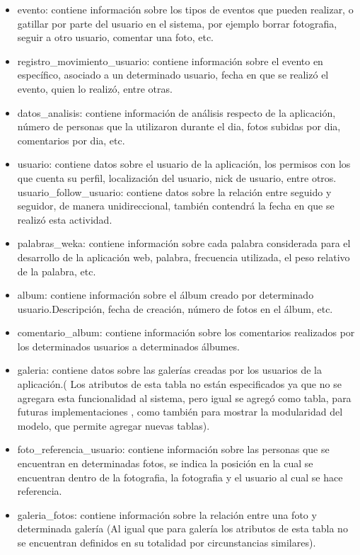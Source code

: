 \documentclass{memoria}
\begin{document}
\begin{itemize}
	\item evento: contiene información sobre los tipos de eventos que pueden realizar, o gatillar por parte del usuario en el sistema, por ejemplo borrar fotografia, seguir a otro usuario, comentar una foto, etc.
	\item registro\_movimiento\_usuario: contiene información sobre el evento en específico, asociado a un determinado usuario, fecha en que se realizó el evento, quien lo realizó, entre otras.
	\item datos\_analisis: contiene información de análisis respecto de la aplicación, número de personas que la utilizaron durante el dia, fotos subidas por dia, comentarios por dia, etc.
	\item usuario: contiene datos sobre el usuario de la aplicación, los permisos con los que cuenta su perfil, localización del usuario, nick de usuario, entre otros.
	usuario\_follow\_usuario: contiene datos sobre la relación entre seguido y seguidor, de manera unidireccional, también contendrá la fecha en que se realizó esta actividad.
	\item palabras\_weka: contiene información sobre cada palabra considerada para el desarrollo de la aplicación web, palabra, frecuencia utilizada, el peso relativo de la palabra, etc.
	\item album: contiene información sobre el álbum creado por determinado usuario.Descripción, fecha de creación, número de fotos en el álbum, etc.
	\item comentario\_album: contiene información sobre los comentarios realizados por los determinados usuarios a determinados álbumes.
	\item galeria: contiene datos sobre las galerías creadas por los usuarios de la aplicación.( Los atributos de esta tabla no están especificados ya que no se agregara esta funcionalidad al sistema, pero igual se agregó como tabla, para futuras implementaciones , como también para mostrar la modularidad del modelo, que permite agregar nuevas tablas).
	\item foto\_referencia\_usuario: contiene información sobre las personas que se encuentran en determinadas fotos, se indica la posición en la cual se encuentran dentro de la fotografia, la fotografia y el usuario al cual se hace referencia.
	\item galeria\_fotos: contiene información sobre la relación entre una foto y determinada galería (Al igual que para galería los atributos de esta tabla no se encuentran definidos en su totalidad por circunstancias similares).

\end{itemize}
\end{document}
